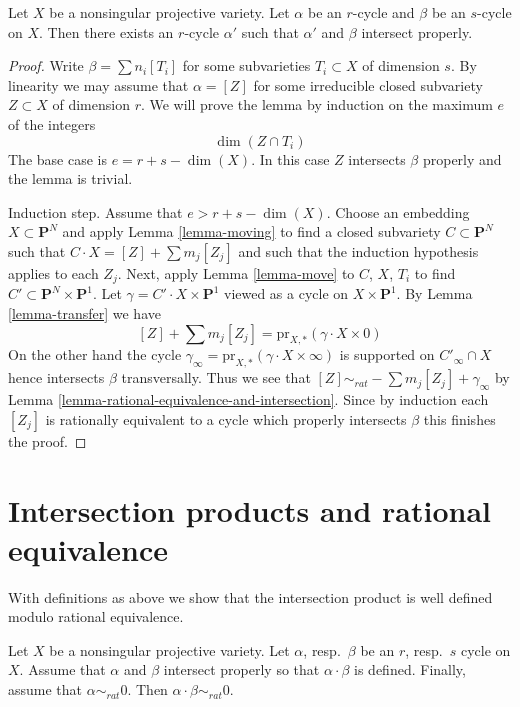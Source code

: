 \begin{lemma}
\label{lemma-moving-move}
Let $X$ be a nonsingular projective variety. Let $\alpha$ be an
$r$-cycle and $\beta$ be an $s$-cycle on $X$. Then there exists
an $r$-cycle $\alpha'$ such that $\alpha'$ and $\beta$ intersect
properly.
\end{lemma}

\begin{proof}
Write $\beta = \sum n_i[T_i]$ for some subvarieties $T_i \subset X$
of dimension $s$. By linearity we may assume that $\alpha = [Z]$ for
some irreducible closed subvariety $Z \subset X$ of dimension $r$.
We will prove the lemma by induction on the maximum $e$ of the integers
$$
\dim(Z \cap T_i)
$$
The base case is $e = r + s - \dim(X)$. In this case $Z$ intersects
$\beta$ properly and the lemma is trivial.

\medskip\noindent
Induction step. Assume that $e > r + s - \dim(X)$. Choose an embedding
$X \subset \mathbf{P}^N$ and apply Lemma \ref{lemma-moving} to find a
closed subvariety $C \subset \mathbf{P}^N$ such that
$C \cdot X = [Z] + \sum m_j[Z_j]$ and such that the induction
hypothesis applies to each $Z_j$. Next, apply Lemma \ref{lemma-move}
to $C$, $X$, $T_i$ to find $C' \subset \mathbf{P}^N \times \mathbf{P}^1$.
Let $\gamma = C' \cdot X \times \mathbf{P}^1$ viewed as a cycle
on $X \times \mathbf{P}^1$. By Lemma \ref{lemma-transfer} we have
$$
[Z] + \sum m_j[Z_j] = \text{pr}_{X, *}(\gamma \cdot X \times 0)
$$
On the other hand the cycle
$\gamma_\infty = \text{pr}_{X, *}(\gamma \cdot X \times \infty)$
is supported on $C'_\infty \cap X$ hence intersects $\beta$ transversally.
Thus we see that $[Z] \sim_{rat} - \sum m_j[Z_j] + \gamma_\infty$
by Lemma \ref{lemma-rational-equivalence-and-intersection}. Since by
induction each $[Z_j]$ is rationally equivalent to a cycle which properly
intersects $\beta$ this finishes the proof.
\end{proof}



\section{Intersection products and rational equivalence}
\label{section-intersections-and-rational-equivalence}

\noindent
With definitions as above we show that the intersection product
is well defined modulo rational equivalence.

\begin{theorem}
\label{theorem-well-defined}
Let $X$ be a nonsingular projective variety. Let $\alpha$, resp.\ $\beta$
be an $r$, resp.\ $s$ cycle on $X$. Assume that $\alpha$ and $\beta$
intersect properly so that $\alpha \cdot \beta$ is defined. Finally,
assume that $\alpha \sim_{rat} 0$. Then $\alpha \cdot \beta \sim_{rat} 0$.
\end{theorem}

